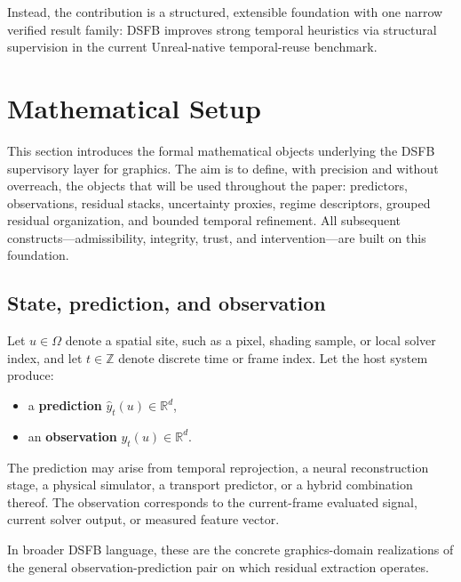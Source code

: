 \documentclass[11pt,letterpaper]{article}
\theoremstyle{gcresult}
\theoremstyle{definition}
\begin{document}
Instead, the contribution is a structured, extensible foundation with one narrow verified result family: DSFB improves strong temporal heuristics via structural supervision in the current Unreal-native temporal-reuse benchmark.


\section{Mathematical Setup}
\label{sec:mathsetup}

This section introduces the formal mathematical objects underlying the DSFB supervisory layer for graphics. The aim is to define, with precision and without overreach, the objects that will be used throughout the paper: predictors, observations, residual stacks, uncertainty proxies, regime descriptors, grouped residual organization, and bounded temporal refinement. All subsequent constructs—admissibility, integrity, trust, and intervention—are built on this foundation.


\subsection{State, prediction, and observation}

Let $u \in \Omega$ denote a spatial site, such as a pixel, shading sample, or local solver index, and let $t \in \mathbb{Z}$ denote discrete time or frame index. Let the host system produce:
\begin{itemize}[leftmargin=1.5em]
    \item a \textbf{prediction} $\hat y_t(u) \in \mathbb{R}^d$,
    \item an \textbf{observation} $y_t(u) \in \mathbb{R}^d$.
\end{itemize}

The prediction may arise from temporal reprojection, a neural reconstruction stage, a physical simulator, a transport predictor, or a hybrid combination thereof. The observation corresponds to the current-frame evaluated signal, current solver output, or measured feature vector.

In broader DSFB language, these are the concrete graphics-domain realizations of the general observation-prediction pair on which residual extraction operates. 
\end{document}
